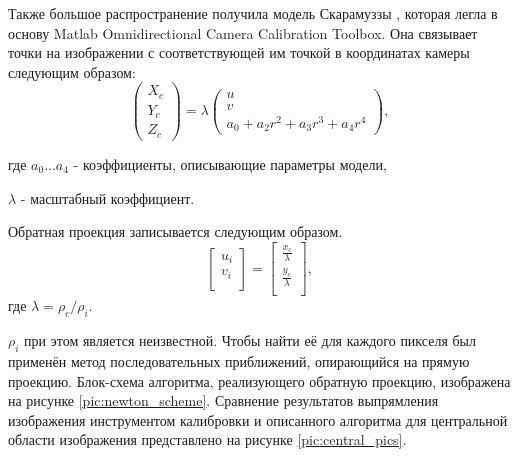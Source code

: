 Также большое распространение получила модель Скарамуззы \cite{scaramuzza}, которая легла в основу Matlab Omnidirectional 
Camera Calibration Toolbox. Она связывает точки на изображении с соответствующей им точкой в координатах камеры
следующим образом:
\vskip 12pt
\begin{equation}	
    \begin{pmatrix}X_c\\Y_c\\Z_c\end{pmatrix} = \lambda \begin{pmatrix}u\\v\\a_0 + a_2 r^2 + a_3 r^3 + a_4 r^4\end{pmatrix},
    \label{eqn:scaramuzza} 
\end{equation}
\vskip 24pt

где $a_0 ... a_4$ - коэффициенты, описывающие параметры модели,

\qquad $\lambda$ - масштабный коэффициент.

Обратная проекция записывается следующим образом.
\vskip 12pt
\begin{equation}
    \label{eq:back_scara}
    \left[\begin{matrix}u_i\\v_i\\\end{matrix}\right] = \left[\begin{matrix} \frac{x_c}{\lambda}  \\  \frac{y_c}{\lambda} \\\end{matrix}\right],
\end{equation} 
\vskip 24pt
где $\lambda = \rho_c / \rho_i$. 

$\rho_i$ при этом является неизвестной. Чтобы найти её для каждого пикселя был применён метод последовательных приближений, опирающийся на прямую проекцию.
 Блок-схема алгоритма, реализующего обратную проекцию, изображена  на рисунке  \ref{pic:newton_scheme}.  Сравнение результатов выпрямления изображения инструментом  
калибровки и описанного алгоритма для центральной области изображения представлено на рисунке \ref{pic:central_pics}. 




